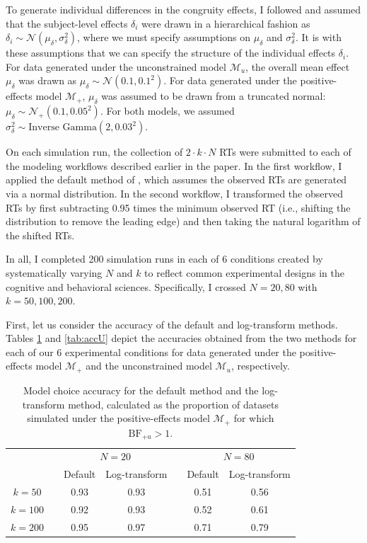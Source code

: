 \documentclass[12pt,twoside,a4paper]{article}
\begin{document}
To generate individual differences in the congruity effects, I followed \citet{rouderKumar} and assumed that the subject-level effects $\delta_i$ were drawn in a hierarchical fashion as $\delta_i \sim \mathcal{N}(\mu_{\delta}, \sigma_{\delta}^2)$, where we must specify assumptions on $\mu_{\delta}$ and $\sigma^2_{\delta}$. It is with these assumptions that we can specify the structure of the individual effects $\delta_i$. For data generated under the unconstrained model $\mathcal{M}_u$, the overall mean effect $\mu_{\delta}$ was drawn as $\mu_{\delta} \sim \mathcal{N}(0.1, 0.1^2)$. For data generated under the positive-effects model $\mathcal{M}_+$, $\mu_{\delta}$ was assumed to be drawn from a truncated normal: $\mu_{\delta} \sim \mathcal{N}_+(0.1, 0.05^2)$. For both models, we assumed $\sigma^2_{\delta} \sim \text{Inverse Gamma}(2, 0.03^2)$.

On each simulation run, the collection of $2\cdot k\cdot N$ RTs were submitted to each of the modeling workflows described earlier in the paper. In the first workflow, I applied the default method of \citet{haaf2017}, which assumes the observed RTs are generated via a normal distribution. In the second workflow, I transformed the observed RTs by first subtracting 0.95 times the minimum observed RT (i.e., shifting the distribution to remove the leading edge) and then taking the natural logarithm of the shifted RTs.

In all, I completed 200 simulation runs in each of 6 conditions created by systematically varying $N$ and $k$ to reflect common experimental designs in the cognitive and behavioral sciences. Specifically, I crossed $N=20,80$ with $k=50, 100, 200$.

First, let us consider the accuracy of the default and log-transform methods. Tables \ref{tab:accP} and \ref{tab:accU} depict the accuracies obtained from the two methods for each of our 6 experimental conditions for data generated under the positive-effects model $\mathcal{M}_+$ and the unconstrained model $\mathcal{M}_u$, respectively.

\begin{table}
  \centering \small
  \begin{tabular}{ccccccc}
    \hline
    & & \multicolumn{2}{c}{$N=20$} & & \multicolumn{2}{c}{$N=80$}\\
    & & Default & Log-transform & & Default & Log-transform\\
    \hline
    $k=50$ & &  0.93 & 0.93 & & 0.51 & 0.56\\
    $k=100$ & & 0.92 & 0.93 & & 0.52 & 0.61\\
    $k=200$ & & 0.95 & 0.97 & & 0.71 & 0.79\\
    \hline
    
  \end{tabular}
  \caption{Model choice accuracy for the default \citet{haaf2017} method and the log-transform method, calculated as the proportion of datasets simulated under the positive-effects model $\mathcal{M}_+$ for which $\text{BF}_{+u}>1$.}
  \label{tab:accP}
\end{table}
\end{document}
